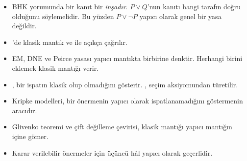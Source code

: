 \begin{bolumozeti}
\begin{itemize}
  \item BHK yorumunda bir kanıt bir \emph{inşadır}. $P \vee Q$'nun kanıtı
        hangi tarafın doğru olduğunu söylemelidir. Bu yüzden
        $P \vee \neg P$ yapıcı olarak genel bir yasa değildir.
  \item \Lean{}'de klasik mantık  ve
         ile açıkça çağrılır.
  \item EM, DNE ve Peirce yasası yapıcı mantıkta birbirine denktir.
        Herhangi birini eklemek klasik mantığı verir.
  \item {}, bir ispatın klasik olup olmadığını gösterir.
        , seçim aksiyomundan türetilir.
  \item Kripke modelleri, bir önermenin yapıcı olarak ispatlanamadığını
        göstermenin aracıdır.
  \item Glivenko teoremi ve çift değilleme çevirisi, klasik mantığı
        yapıcı mantığın içine gömer.
  \item Karar verilebilir önermeler için üçüncü hâl yapıcı olarak
        geçerlidir.
\end{itemize}
\end{bolumozeti}

